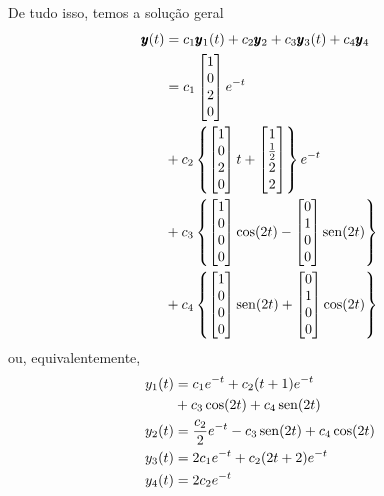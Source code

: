 \begin{resol}
  De tudo isso, temos a solução geral
  \begin{align}
    \pmb{y}(t) &= c_1\pmb{y}_1(t) + c_2\pmb{y}_2 + c_3\pmb{y}_3(t) + c_4\pmb{y}_4 \\
    &= c_1
    \begin{bmatrix}
      1 \\
      0 \\
      2 \\
      0
    \end{bmatrix}e^{-t} \\
    &+ c_2\left\{
    \begin{bmatrix}
      1 \\
      0 \\
      2 \\
      0
    \end{bmatrix}t +
    \begin{bmatrix}
      1 \\
      \frac{1}{2} \\
      2 \\
      2
    \end{bmatrix}\right\}e^{-t} \\
    &+ c_3\left\{
    \begin{bmatrix}
      1 \\
      0 \\
      0 \\
      0
    \end{bmatrix}\cos(2t) -
    \begin{bmatrix}
      0 \\ 1 \\ 0 \\ 0
    \end{bmatrix}\operatorname{sen}(2t)\right\} \\
    &+ c_4\left\{
    \begin{bmatrix}
      1 \\
      0 \\
      0 \\
      0
    \end{bmatrix}\operatorname{sen}(2t) +
    \begin{bmatrix}
      0 \\ 1 \\ 0 \\ 0
    \end{bmatrix}\cos(2t)\right\}
  \end{align}
  ou, equivalentemente,
  \begin{align}
    y_1(t) &= c_1e^{-t} + c_2(t + 1)e^{-t} \\
    &+ c_3\cos(2t) + c_4\operatorname{sen}(2t) \\
    y_2(t) &= \frac{c_2}{2}e^{-t} - c_3\operatorname{sen}(2t) + c_4\cos(2t) \\
    y_3(t) &= 2c_1e^{-t} + c_2(2t + 2)e^{-t} \\
    y_4(t) &= 2c_2e^{-t}
  \end{align}
\end{resol}

